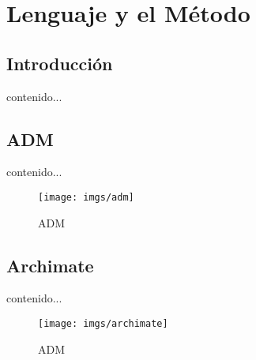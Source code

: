 \chapter{Lenguaje y el Método}
\section{Introducción}
contenido...
\newpage
\section{ADM  \cite{1,2,3,4,5,6,7,bol}}
contenido...
\begin{figure}[h!]
	\centering
	\texttt{[image: imgs/adm]}
	\caption{ADM}
\end{figure}
\newpage

\section{Archimate}
contenido...
\begin{figure}[h!]
	\centering
	\texttt{[image: imgs/archimate]}
	\caption{ADM}
\end{figure}
\newpage